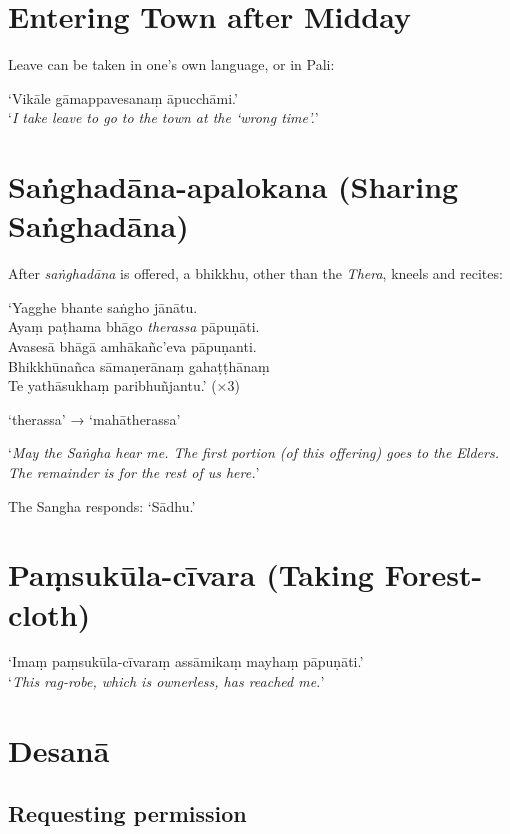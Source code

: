 \section{Entering Town after Midday}

Leave can be taken in one's own language, or in Pali:

‘Vikāle gāmappavesanaṃ āpucchāmi.’\\
‘\emph{I take leave to go to the town at the ‘wrong time’.}’ 

\section{Saṅghadāna-apalokana (Sharing Saṅghadāna)}

After \emph{saṅghadāna} is offered, a bhikkhu, other than the \emph{Thera},
kneels and recites:

‘Yagghe bhante saṅgho jānātu.\\
Ayaṃ paṭhama bhāgo \emph{therassa} pāpuṇāti.\\
Avasesā bhāgā amhākañc’eva pāpuṇanti.\\
Bhikkhūnañca sāmaṇerānaṃ gahaṭṭhānaṃ\\
Te yathāsukhaṃ paribhuñjantu.’ (×3)

‘therassa’ → ‘mahātherassa’


‘\emph{May the Saṅgha hear me. The first portion (of this offering) goes to the
  Elders. The remainder is for the rest of us here.}’

The Sangha responds: ‘Sādhu.’ 

\section{Paṃsukūla-cīvara (Taking Forest-cloth)}

‘Imaṃ paṃsukūla-cīvaraṃ assāmikaṃ mayhaṃ pāpuṇāti.’\\
‘\emph{This rag-robe, which is ownerless, has reached me.}’

\section{Desanā}

\subsection{Requesting permission}

